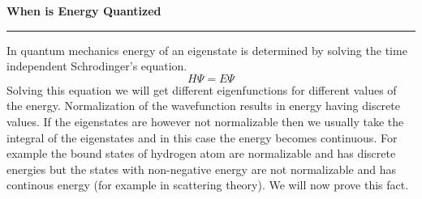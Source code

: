 \documentclass[a4paper, 11pt]{article}
\begin{document}
\begin{center}
	\Large\bfseries When is Energy Quantized
	\vspace{.15em}\hrule
\end{center}

In quantum mechanics energy of an eigenstate is determined by solving the time independent
Schrodinger's equation.
\begin{equation}
	H \Psi = E \Psi
\end{equation}
Solving this equation we will get different eigenfunctions for different values of the energy.
Normalization of the wavefunction results in energy having discrete values. If the eigenstates are
however not normalizable then we usually take the integral of the eigenstates and in this case the
energy becomes continuous. For example the bound states of hydrogen atom are normalizable and has
discrete energies but the states with non-negative energy are not normalizable and has continous
energy (for example in scattering theory). We will now prove this fact.
\medskip
\end{document}
